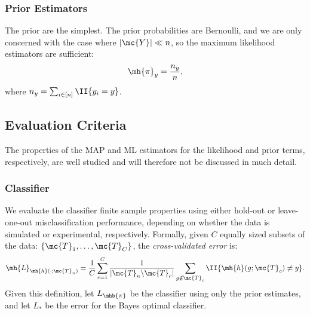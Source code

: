 \documentclass[10pt,journal,cspaper,compsoc]{IEEEtran}
\begin{document}



\subsubsection{Prior Estimators} %
\label{sub:prior_estimators}

The prior are the simplest.  The prior probabilities are Bernoulli, and we are only concerned with the case where $|\mc{Y}| \ll n$, so the maximum likelihood estimators are sufficient:
\begin{align}
\mh{\pi}_y = \frac{n_y}{n},
\end{align}
where $n_y=\sum_{i \in [n]} \II\{y_i = y\}$.



\subsection{Evaluation Criteria} %
\label{sub:evaluation_criteria}

The properties of the MAP and ML estimators for the likelihood and prior terms, respectively, are well studied \cite{Bickel2000} and will therefore not be discussed in much detail.  


\subsubsection{Classifier} %
\label{ssub:classifier}

We evaluate the classifier finite sample properties using either hold-out or leave-one-out misclassification performance, depending on whether the data is simulated or experimental, respectively.  Formally, given $C$ equally sized subsets of the data: $\{\mc{T}_{1}, \ldots, \mc{T}_{C}\}$, the \emph{cross-validated error} is:
\begin{align} \label{eq:L2}
	\mh{L}_{\mh{h}(\cdot; \mc{T}_n)} = \frac{1}{C}\sum_{c=1}^C \frac{1}{|\mc{T}_n \backslash \mc{T}_c|}\sum_{g \notin \mc{T}_c} \II\{\mh{h}(g; \mc{T}_{c}) \neq y\}.
\end{align}
Given this definition, let $L_{\mhb{\pi}}$ be the classifier using only the prior estimates, and let $L_*$ be the error for the Bayes optimal classifier.  
\end{document}
